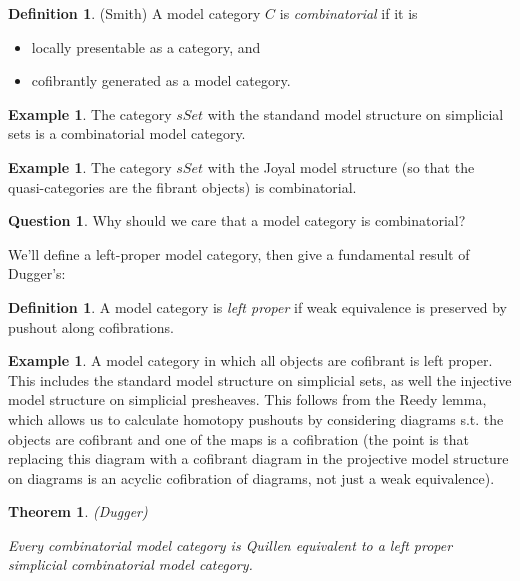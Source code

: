 \documentclass[letterpaper]{article}
\newtheorem{theorem}{Theorem}
\theoremstyle{definition}
\newtheorem{example}[lemma]{Example}
\newtheorem{definition}[lemma]{Definition}
\newtheorem{question}{Question}
\begin{document}
\begin{definition}(Smith)
A model category $C$ is \emph{combinatorial} if it is

\begin{itemize}
\item locally presentable as a category, and 
\item cofibrantly generated as a model category.
\end{itemize}


\end{definition}

\begin{example}
The category $sSet$ with the standand model structure on simplicial
sets is a combinatorial model category. 
\end{example}

\begin{example}
The category $sSet$ with the Joyal model structure (so that the
quasi-categories are the fibrant objects) is combinatorial.
\end{example}

\begin{question}
Why should we care that a model category is combinatorial?
\end{question}




We'll define a left-proper model category, then give a fundamental
result of Dugger's:

\begin{definition}
A model category is \emph{left proper} if weak equivalence is
preserved by pushout along cofibrations.
\end{definition}

\begin{example}
A model category in which all objects are cofibrant is left
proper. This includes the standard model structure on simplicial sets,
as well the injective model structure on simplicial presheaves. This
follows from the Reedy lemma, which allows us to calculate homotopy
pushouts by considering diagrams s.t. the objects are cofibrant and
one of the maps is a cofibration (the point is that replacing this
diagram with a cofibrant diagram in the projective model structure on
diagrams is an acyclic cofibration of diagrams, not just a weak equivalence).
\end{example}

\begin{theorem}(Dugger)

Every combinatorial model category is Quillen equivalent to a left
proper simplicial combinatorial model category. 
\end{theorem}
\end{document}
